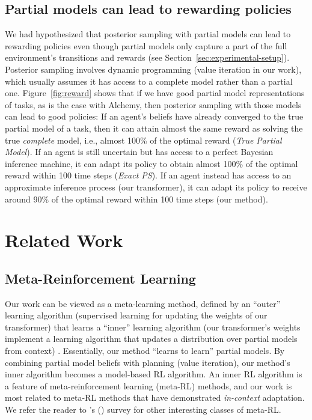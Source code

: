 \documentclass[sigconf]{aamas}
\begin{document}
\subsection{Partial models can lead to rewarding policies}
We had hypothesized that posterior sampling with partial models can lead to rewarding policies even though partial models only capture a part of the full environment's transitions and rewards (see Section~\ref{sec:experimental-setup}). Posterior sampling involves dynamic programming (value iteration in our work), which usually assumes it has access to a complete model rather than a partial one. Figure~\ref{fig:reward} shows that if we have good partial model representations of tasks, as is the case with Alchemy, then posterior sampling with those models can lead to good policies: If an agent's beliefs have already converged to the true partial model of a task, then it can attain almost the same reward as solving the true \textit{complete} model, i.e., almost 100\% of the optimal reward (\textit{True Partial Model}). If an agent is still uncertain but has access to a perfect Bayesian inference machine, it can adapt its policy to obtain almost 100\% of the optimal reward within 100 time steps (\textit{Exact PS}). If an agent instead has access to an approximate inference process (our transformer), it can adapt its policy to receive around 90\% of the optimal reward within 100 time steps (our method). 

\section{Related Work}\label{sec:related}

\balance

\subsection{Meta-Reinforcement Learning} Our work can be viewed as a meta-learning method, defined by an ``outer'' learning algorithm (supervised learning for updating the weights of our transformer) that learns a ``inner'' learning algorithm (our transformer's weights implement a learning algorithm that updates a distribution over partial models from context) \cite{hospedalesMetaLearningNeuralNetworks2022}. Essentially, our method ``learns to learn'' partial models. By combining partial model beliefs with planning (value iteration), our method's inner algorithm becomes a model-based RL algorithm. An inner RL algorithm is a feature of meta-reinforcement learning (meta-RL) methods, and our work is most related to meta-RL methods that have demonstrated \textit{in-context} adaptation. We refer the reader to \citeauthor{hospedalesMetaLearningNeuralNetworks2022}'s (\citeyear{hospedalesMetaLearningNeuralNetworks2022}) survey for other interesting classes of meta-RL.
\end{document}
